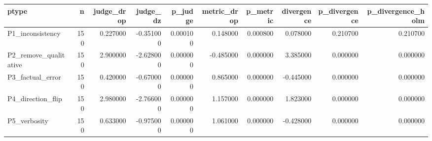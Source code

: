 \begin{tabular}{lrrrrrrrrr}
\toprule
ptype & n & judge_drop & judge_dz & p_judge & metric_drop & p_metric & divergence & p_divergence & p_divergence_holm \\
\midrule
P1_inconsistency & 150 & 0.227000 & -0.351000 & 0.000100 & 0.148000 & 0.000800 & 0.078000 & 0.210700 & 0.210700 \\
P2_remove_qualitative & 150 & 2.900000 & -2.628000 & 0.000000 & -0.485000 & 0.000000 & 3.385000 & 0.000000 & 0.000000 \\
P3_factual_error & 150 & 0.420000 & -0.670000 & 0.000000 & 0.865000 & 0.000000 & -0.445000 & 0.000000 & 0.000000 \\
P4_direction_flip & 150 & 2.980000 & -2.766000 & 0.000000 & 1.157000 & 0.000000 & 1.823000 & 0.000000 & 0.000000 \\
P5_verbosity & 150 & 0.633000 & -0.975000 & 0.000000 & 1.061000 & 0.000000 & -0.428000 & 0.000000 & 0.000000 \\
\bottomrule
\end{tabular}
